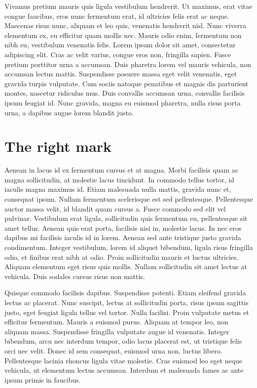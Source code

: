 Vivamus pretium mauris quis ligula vestibulum hendrerit. Ut maximus, erat vitae congue faucibus, eros nunc fermentum erat, id ultricies felis erat ac neque. Maecenas risus nunc, aliquam et leo quis, venenatis hendrerit nisl. Nunc viverra elementum ex, eu efficitur quam mollis nec. Mauris odio enim, fermentum non nibh eu, vestibulum venenatis felis. Lorem ipsum dolor sit amet, consectetur adipiscing elit. Cras ac velit varius, congue eros non, fringilla sapien. Fusce pretium porttitor urna a accumsan. Duis pharetra lorem vel mauris vehicula, non accumsan lectus mattis. Suspendisse posuere massa eget velit venenatis, eget gravida turpis vulputate. Cum sociis natoque penatibus et magnis dis parturient montes, nascetur ridiculus mus. Duis convallis accumsan urna, convallis facilisis ipsum feugiat id. Nunc gravida, magna eu euismod pharetra, nulla risus porta urna, a dapibus augue lorem blandit justo.


\section{The right mark}


Aenean in lacus id ex fermentum cursus et at magna. Morbi facilisis quam ac magna sollicitudin, at molestie lacus tincidunt. In commodo tellus tortor, id iaculis magna maximus id. Etiam malesuada nulla mattis, gravida nunc et, consequat ipsum. Nullam fermentum scelerisque est sed pellentesque. Pellentesque auctor massa velit, id blandit quam cursus a. Fusce commodo sed elit vel pulvinar. Vestibulum erat ligula, sollicitudin quis fermentum eu, pellentesque sit amet tellus. Aenean quis erat porta, facilisis nisi in, molestie lacus. In nec eros dapibus mi facilisis iaculis id in lorem. Aenean sed ante tristique justo gravida condimentum. Integer vestibulum, lorem id aliquet bibendum, ligula risus fringilla odio, et finibus erat nibh at odio. Proin sollicitudin mauris et luctus ultricies. Aliquam elementum eget risus quis mollis. Nullam sollicitudin sit amet lectus at vehicula. Duis sodales cursus risus non mattis.

Quisque commodo facilisis dapibus. Suspendisse potenti. Etiam eleifend gravida lectus ac placerat. Nunc suscipit, lectus at sollicitudin porta, risus ipsum sagittis justo, eget feugiat ligula tellus vel tortor. Nulla facilisi. Proin vulputate metus et efficitur fermentum. Mauris a euismod purus. Aliquam at tempor leo, non aliquam massa. Suspendisse fringilla vulputate augue id venenatis. Integer bibendum, arcu nec interdum tempor, odio lacus placerat est, ut tristique felis orci nec velit. Donec id sem consequat, euismod urna non, luctus libero. Pellentesque lacinia rhoncus ligula vitae molestie. Cras euismod leo eget neque vehicula, ut elementum lectus accumsan. Interdum et malesuada fames ac ante ipsum primis in faucibus.

